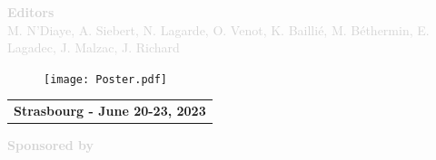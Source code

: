 \vspace{1.2cm}
\noindent \textcolor{lightgray}{\bf Editors}\\
\noindent \textcolor{lightgray}{M. N'Diaye, A. Siebert, N. Lagarde, O. Venot, K. Bailli\'e, M. B\'ethermin, E. Lagadec, J. Malzac, J. Richard}


\vspace{0.1cm}

\begin{figure}[hb]
\centering
\texttt{[image: Poster.pdf]}
\end{figure}
\vspace{-2cm}

\begin{center}
\begin{tabular}{l}
{\Large \bf Strasbourg - June 20-23, 2023}
\end{tabular}
\end{center}

\begin{center}
\noindent \textcolor{lightgray}{\bf Sponsored by}

\vspace*{0.5cm}

\hspace{-0.8cm}
\noindent{}
\end{center}


\newpage

